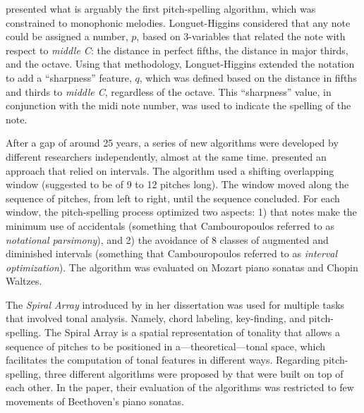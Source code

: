

\textcite{longuethiggins1976perception} presented what is
arguably the first pitch-spelling algorithm, which was
constrained to monophonic melodies. Longuet-Higgins
considered that any note could be assigned a number, $p$,
based on 3-variables that related the note with respect to
\emph{middle C}: the distance in perfect fifths, the
distance in major thirds, and the octave. Using that
methodology, Longuet-Higgins extended the notation to add a
``sharpness'' feature, $q$, which was defined based on the
distance in fifths and thirds to \emph{middle C}, regardless
of the octave. This ``sharpness'' value, in conjunction with
the \gls{midi} note number, was used to indicate the
spelling of the note.

After a gap of around 25 years, a series of new algorithms
were developed by different researchers independently,
almost at the same time. \textcite{cambouropoulos2003pitch}
presented an approach that relied on intervals. The
algorithm used a shifting overlapping window (suggested to
be of 9 to 12 pitches long). The window moved along the
sequence of pitches, from left to right, until the sequence
concluded. For each window, the pitch-spelling process
optimized two aspects: 1) that notes make the minimum use of
accidentals (something that Cambouropoulos referred to as
\emph{notational parsimony}), and 2) the avoidance of 8
classes of augmented and diminished intervals (something
that Cambouropoulos referred to as \emph{interval
optimization}). The algorithm was evaluated on Mozart piano
sonatas and Chopin Waltzes.

The \emph{Spiral Array} introduced by
\textcite{chew2000towards} in her dissertation was used for
multiple tasks that involved tonal analysis. Namely, chord
labeling, key-finding, and pitch-spelling. The Spiral Array
is a spatial representation of tonality that allows a
sequence of pitches to be positioned in
a---theoretical---tonal space, which facilitates the
computation of tonal features in different ways. Regarding
pitch-spelling, three different algorithms were proposed by
\textcite{chew2003determining} that were built on top of
each other. In the paper, their evaluation of the algorithms
was restricted to few movements of Beethoven's piano
sonatas.

